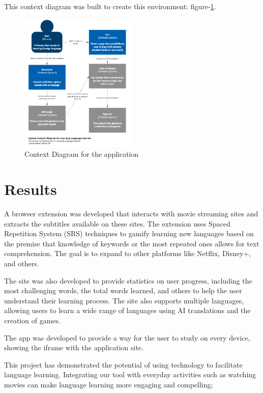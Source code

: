 \documentclass[12pt]{article}
\begin{document}
This context diagram was built to create this environment: figure-\ref{fig:context_diagram}.

\begin{figure}[h]
\centering
\caption{
Context Diagram for the application
}
\label{fig:context_diagram}
\includegraphics[width=0.5\textwidth]{assets/4.png}
\end{figure}


\section{Results}


A browser extension was developed that interacts with movie streaming sites and extracts the subtitles available on these sites. The extension uses Spaced Repetition System (SRS) techniques to gamify learning new languages based on the premise that knowledge of keywords or the most repeated ones allows for text comprehension. The goal is to expand to other platforms like Netflix, Disney+, and others.

The site was also developed to provide statistics on user progress, including the most challenging words, the total words learned, and others to help the user understand their learning process. The site also supports multiple languages, allowing users to learn a wide range of languages using AI translations and the creation of games. 

The app was developed to provide a way for the user to study on every device, showing the iframe with the application site.

This project has demonstrated the potential of using technology to facilitate language learning. Integrating our tool with everyday activities such as watching movies can make language learning more engaging and compelling; 
\end{document}
